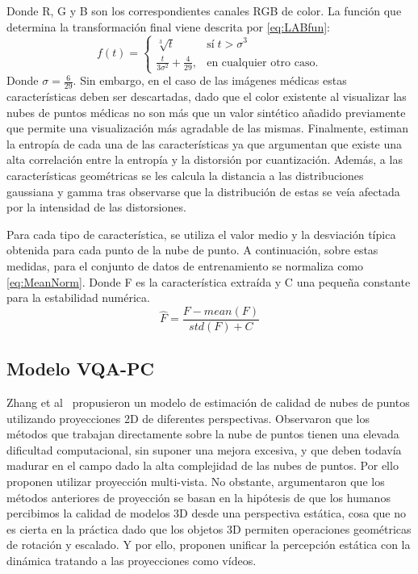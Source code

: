 Donde R, G y B son los correspondientes canales RGB de color. La función que 
determina la transformación final viene descrita por \eqref{eq:LABfun}: 
\begin{equation}
  f(t) = \begin{cases} \sqrt[3]{t} & \textrm{sí}\; t > \sigma^3 \\ 
    \frac{t}{3\sigma^2} + \frac{4}{29},& \textrm{en cualquier otro caso.}
         \end{cases}  
  \label{eq:LABfun}
\end{equation}
Donde $\sigma = \frac{6}{29}$.
Sin embargo, en el caso de las imágenes médicas estas características deben 
ser descartadas, dado que el color existente al visualizar las nubes de puntos 
médicas no son más que un valor sintético añadido previamente que permite 
una visualización más agradable de las mismas. 
Finalmente, estiman la entropía de cada una de las características 
ya que argumentan que existe una alta correlación entre la 
entropía y la distorsión por cuantización. 
Además, a las características geométricas se les calcula 
la distancia a las distribuciones gaussiana y gamma tras observarse 
que la distribución de estas se veía afectada por la intensidad 
de las distorsiones. 

Para cada tipo de característica, se utiliza el valor medio y la desviación típica 
obtenida para cada punto de la nube de punto. A continuación, sobre estas medidas, 
para el conjunto de datos de entrenamiento se normaliza como \eqref{eq:MeanNorm}.
Donde F es la característica extraída y C una pequeña constante para la 
estabilidad numérica. 
\begin{equation} 
  \hat F = \frac{F-mean(F)}{std(F) + C}
  \label{eq:MeanNorm}
\end{equation}


\subsection{Modelo VQA-PC}
Zhang et al~\cite{VQA-PC} propusieron un modelo de estimación de calidad de nubes 
de puntos utilizando proyecciones 2D de diferentes perspectivas. 
Observaron que los métodos que trabajan directamente sobre la nube de puntos tienen
una elevada dificultad computacional, sin suponer una mejora excesiva, y que 
deben todavía madurar en el campo dado la alta complejidad de las nubes de puntos.
Por ello proponen utilizar proyección multi-vista. No obstante, argumentaron que 
los métodos anteriores de proyección se basan en la hipótesis de que los humanos 
percibimos la calidad de modelos 3D desde una perspectiva estática, cosa que no 
es cierta en la práctica dado que los objetos 3D permiten operaciones geométricas 
de rotación y escalado.
Y por ello, proponen unificar la percepción estática con la dinámica tratando 
a las proyecciones como vídeos.


